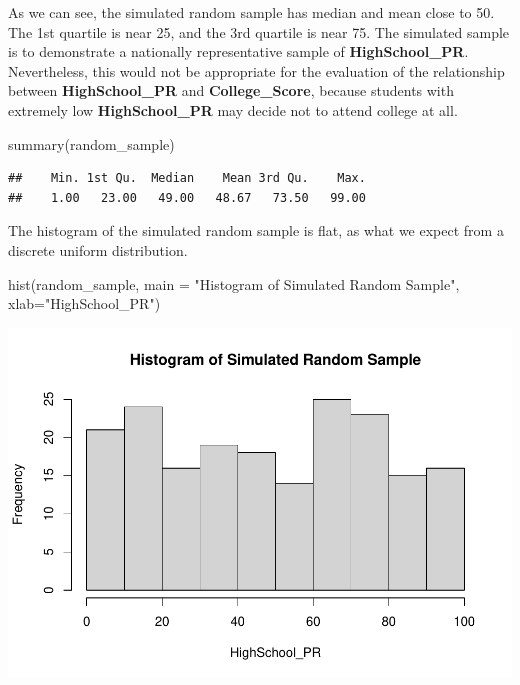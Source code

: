 \documentclass[
]{article}
\newenvironment{Shaded}{\begin{snugshade}}{\end{snugshade}}
\newcommand{\AttributeTok}[1]{\textcolor[rgb]{0.77,0.63,0.00}{#1}}
\newcommand{\FunctionTok}[1]{\textcolor[rgb]{0.00,0.00,0.00}{#1}}
\newcommand{\NormalTok}[1]{#1}
\newcommand{\StringTok}[1]{\textcolor[rgb]{0.31,0.60,0.02}{#1}}
\begin{document}
As we can see, the simulated random sample has median and mean close to
50. The 1st quartile is near 25, and the 3rd quartile is near 75. The
simulated sample is to demonstrate a nationally representative sample of
\textbf{HighSchool\_PR}. Nevertheless, this would not be appropriate for
the evaluation of the relationship between \textbf{HighSchool\_PR} and
\textbf{College\_Score}, because students with extremely low
\textbf{HighSchool\_PR} may decide not to attend college at all.

\begin{Shaded}
\begin{Highlighting}[]
\FunctionTok{summary}\NormalTok{(random\_sample)}
\end{Highlighting}
\end{Shaded}

\begin{verbatim}
##    Min. 1st Qu.  Median    Mean 3rd Qu.    Max. 
##    1.00   23.00   49.00   48.67   73.50   99.00
\end{verbatim}

The histogram of the simulated random sample is flat, as what we expect
from a discrete uniform distribution.

\begin{Shaded}
\begin{Highlighting}[]
\FunctionTok{hist}\NormalTok{(random\_sample, }\AttributeTok{main =} \StringTok{"Histogram of Simulated Random Sample"}\NormalTok{, }\AttributeTok{xlab=}\StringTok{"HighSchool\_PR"}\NormalTok{)}
\end{Highlighting}
\end{Shaded}

\includegraphics{PTT_Analysis_of_Test_Scores_Unfinished_files/figure-latex/random-data-histogram-1.pdf}
\end{document}
